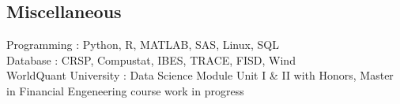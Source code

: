 \documentclass[margin]{res}
\begin{document}
\begin{resume}
		
		\section{\sc Miscellaneous}
		
		Programming : Python, R, MATLAB, SAS, Linux, SQL
		\\
		Database : CRSP, Compustat, IBES, TRACE, FISD, Wind
		\\
		WorldQuant University : Data Science Module Unit I \& II with Honors, Master in Financial Engeneering course work in progress
		
		
		
	\end{resume}
	\(\)
\end{document}

